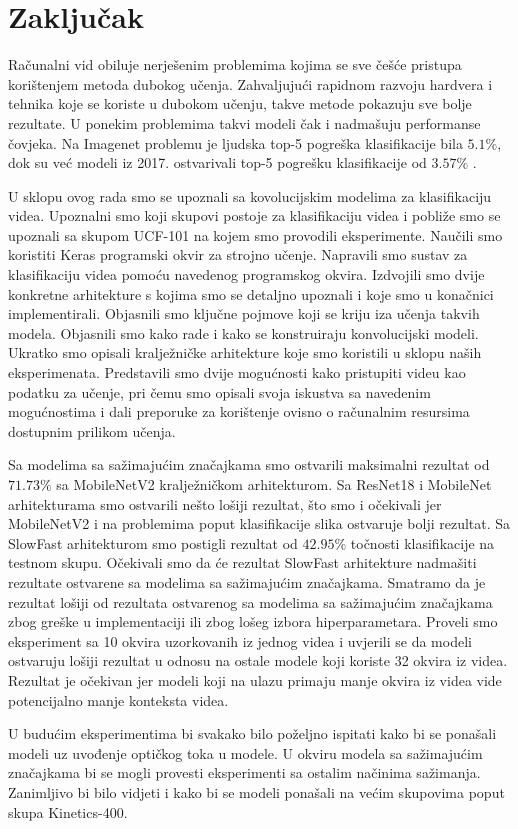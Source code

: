 \documentclass[times, utf8, diplomski,  numeric]{fer}
\begin{document}
\chapter{Zaključak}
Računalni vid obiluje nerješenim problemima kojima se sve češće pristupa korištenjem metoda dubokog učenja. Zahvaljujući rapidnom razvoju hardvera i tehnika koje se koriste u dubokom učenju, takve metode pokazuju sve bolje rezultate. U ponekim problemima takvi modeli čak i nadmašuju performanse čovjeka. Na Imagenet problemu je ljudska top-5 pogreška klasifikacije bila $5.1\%$, dok su već modeli iz 2017. ostvarivali top-5 pogrešku klasifikacije od $3.57\%$ \cite{humans}.
\par
U sklopu ovog rada smo se upoznali sa kovolucijskim modelima za klasifikaciju videa. Upoznalni smo koji skupovi postoje za klasifikaciju videa i pobliže smo se upoznali sa skupom UCF-101 na kojem smo provodili eksperimente. Naučili smo koristiti Keras programski okvir za strojno učenje. Napravili smo sustav za klasifikaciju videa pomoću navedenog programskog okvira. Izdvojili smo dvije konkretne arhitekture s kojima smo se detaljno upoznali i koje smo u konačnici implementirali. Objasnili smo ključne pojmove koji se kriju iza učenja takvih modela. Objasnili smo kako rade i kako se konstruiraju konvolucijski modeli. Ukratko smo opisali kralježničke arhitekture koje smo koristili u sklopu naših eksperimenata. Predstavili smo dvije mogućnosti kako pristupiti videu kao podatku za učenje, pri čemu smo opisali svoja iskustva sa navedenim mogućnostima i dali preporuke za korištenje ovisno o računalnim resursima dostupnim prilikom učenja.
\par
Sa modelima sa sažimajućim značajkama smo ostvarili maksimalni rezultat od $71.73\%$ sa MobileNetV2 kralježničkom arhitekturom. Sa ResNet18 i MobileNet arhitekturama smo ostvarili nešto lošiji rezultat, što smo i očekivali jer MobileNetV2 i na problemima poput klasifikacije slika ostvaruje bolji rezultat. Sa SlowFast arhitekturom smo postigli rezultat od $42.95\%$ točnosti klasifikacije na testnom skupu. Očekivali smo da će rezultat SlowFast arhitekture nadmašiti rezultate ostvarene sa modelima sa sažimajućim značajkama. Smatramo da je rezultat lošiji od rezultata ostvarenog sa modelima sa sažimajućim značajkama zbog greške u implementaciji ili zbog lošeg izbora hiperparametara. Proveli smo eksperiment sa 10 okvira uzorkovanih iz jednog videa i uvjerili se da modeli ostvaruju lošiji rezultat u odnosu na ostale modele koji koriste 32 okvira iz videa. Rezultat je očekivan jer modeli koji na ulazu primaju manje okvira iz videa vide potencijalno manje konteksta videa.
\par
U budućim eksperimentima bi svakako bilo poželjno ispitati kako bi se ponašali modeli uz uvođenje optičkog toka u modele. U okviru modela sa sažimajućim značajkama bi se mogli provesti eksperimenti sa ostalim načinima sažimanja. Zanimljivo bi bilo vidjeti i kako bi se modeli ponašali na većim skupovima poput skupa Kinetics-400. 


\end{document}
